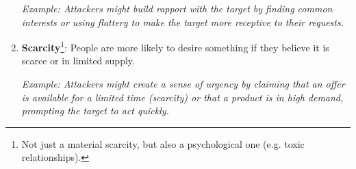 \begin{enumerate}
    \hspace{1cm} \textit{Example: Attackers might build rapport with the target by finding common interests or using flattery to make the target more receptive to their requests.}

    \item \textbf{Scarcity}\footnote{Not just a material scarcity, but also a psychological one (e.g. toxic relationships).}: People are more likely to desire something if they believe it is scarce or in limited supply.
    
    \hspace{1cm} \textit{Example: Attackers might create a sense of urgency by claiming that an offer is available for a limited time (scarcity) or that a product is in high demand, prompting the target to act quickly.}

\end{enumerate}

